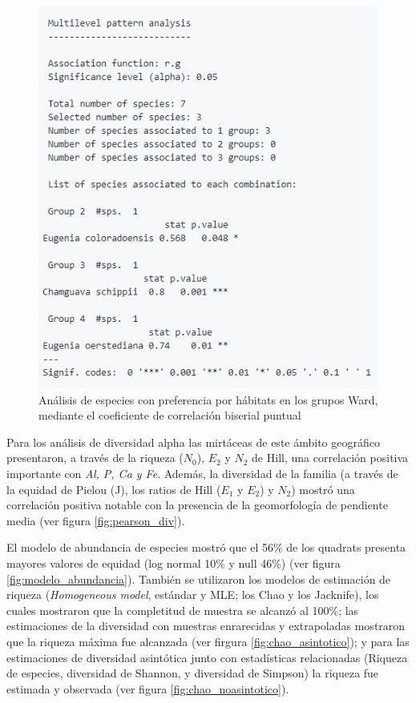 \documentclass[11pt,]{article}
\begin{document}
\begin{figure}
\centering
\includegraphics{rg_analisis.png}
\caption{Análisis de especies con preferencia por hábitats en los grupos
Ward, mediante el coeficiente de correlación biserial puntual
\label{fig:rg_analisis}}
\end{figure}

Para los análisis de diversidad alpha las mirtáceas de este ámbito
geográfico presentaron, a través de la riqueza (\(N_0\)), \(E_2\) y
\(N_2\) de Hill, una correlación positiva importante con \emph{Al, P, Ca
y Fe}. Además, la diversidad de la familia (a través de la equidad de
Pielou (J), los ratios de Hill (\(E_1\) y \(E_2\)) y \(N_2\)) mostró una
correlación positiva notable con la presencia de la geomorfología de
pendiente media (ver figura \ref{fig:pearson_div}).

El modelo de abundancia de especies mostró que el 56\% de los quadrats
presenta mayores valores de equidad (log normal 10\% y null 46\%) (ver
figura \ref{fig:modelo_abundancia}). También se utilizaron los modelos
de estimación de riqueza (\emph{Homogeneous model}, estándar y MLE; los
Chao y los Jacknife), los cuales mostraron que la completitud de muestra
se alcanzó al 100\%; las estimaciones de la diversidad con muestras
enrarecidas y extrapoladas mostraron que la riqueza máxima fue alcanzada
(ver firgura \ref{fig:chao_asintotico}); y para las estimaciones de
diversidad asintótica junto con estadísticas relacionadas (Riqueza de
especies, diversidad de Shannon, y diversidad de Simpson) la riqueza fue
estimada y observada (ver figura \ref{fig:chao_noasintotico}).
\end{document}
